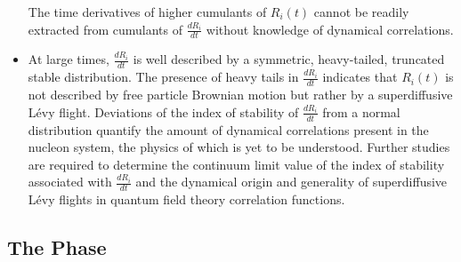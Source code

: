 \begin{itemize}
  The time derivatives of higher cumulants of $R_i(t)$ cannot be readily extracted from cumulants of $\frac{dR_i}{dt}$ 
  without knowledge of dynamical correlations.
  \item 
  At large times, $\frac{dR_i}{dt}$ is well described by a symmetric, heavy-tailed, truncated stable distribution. 
  The presence of heavy tails in $\frac{dR_i}{dt}$ indicates that $R_i(t)$ is not described by free particle Brownian motion 
  but rather by a superdiffusive L{\'e}vy flight. 
  Deviations of the index of stability of $\frac{dR_i}{dt}$ from a normal distribution quantify the amount of dynamical correlations 
  present in the nucleon system, the physics of which is yet to be understood. 
  Further studies are required to determine the continuum limit value of the index of stability associated with 
  $\frac{dR_i}{dt}$ and the dynamical origin and generality of superdiffusive L{\'e}vy flights in quantum field theory correlation functions.
\end{itemize}





\subsection{The Phase}
\label{sec:phase}

